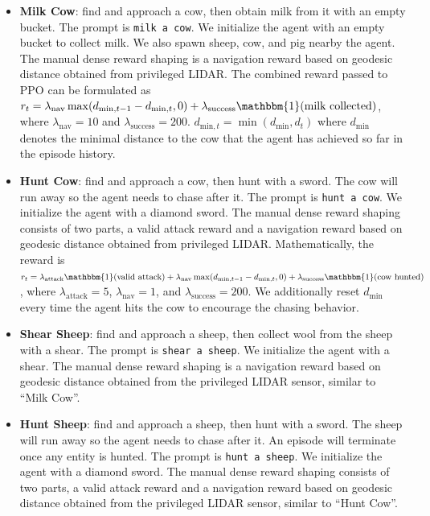 \begin{itemize}
    \item  \textbf{Milk Cow}: find and approach a cow, then obtain milk from it with an empty bucket. The prompt is \texttt{milk a cow}. We initialize the agent with an empty bucket to collect milk. We also spawn sheep, cow, and pig nearby the agent. The manual dense reward shaping is a navigation reward based on geodesic distance obtained from privileged LIDAR. The combined reward passed to PPO can be formulated as $r_t = \lambda_{\text{nav}}\max(d_{\text{min}, t - 1} - d_{\text{min}, t}, 0) + \lambda_{\text{success}} \mathbbm{1}(\text{milk collected})$, where $\lambda_{\text{nav}} = 10$ and $\lambda_{\text{success}} = 200$. $d_{\text{min}, t} = \min(d_{\text{min}}, d_{t})$ where $d_{\text{min}}$ denotes the minimal distance to the cow that the agent has achieved so far in the episode history. 
    \item \textbf{Hunt Cow}: find and approach a cow, then hunt with a sword. The cow will run away so the agent needs to chase after it. The prompt is \texttt{hunt a cow}. We initialize the agent with a diamond sword. The manual dense reward shaping consists of two parts, a valid attack reward and a navigation reward based on geodesic distance obtained from privileged LIDAR. Mathematically, the reward is $r_t = \lambda_{\text{attack}}\mathbbm{1}(\text{valid attack}) + \lambda_{\text{nav}}\max(d_{\text{min}, t - 1} - d_{\text{min}, t}, 0) + \lambda_{\text{success}} \mathbbm{1}(\text{cow hunted})$, where $\lambda_{\text{attack}} = 5$, $\lambda_{\text{nav}} = 1$, and $\lambda_{\text{success}} = 200$. We additionally reset $d_\text{min}$ every time the agent hits the cow to encourage the chasing behavior. 
    \item \textbf{Shear Sheep}: find and approach a sheep, then collect wool from the sheep with a shear. The prompt is \texttt{shear a sheep}. We initialize the agent with a shear. The manual dense reward shaping is a navigation reward based on geodesic distance obtained from the privileged LIDAR sensor, similar to ``Milk Cow''.
    \item \textbf{Hunt Sheep}: find and approach a sheep, then hunt with a sword. The sheep will run away so the agent needs to chase after it. An episode will terminate once any entity is hunted. The prompt is \texttt{hunt a sheep}. We initialize the agent with a diamond sword. The manual dense reward shaping consists of two parts, a valid attack reward and a navigation reward based on geodesic distance obtained from the privileged LIDAR sensor, similar to ``Hunt Cow''.
\end{itemize}

